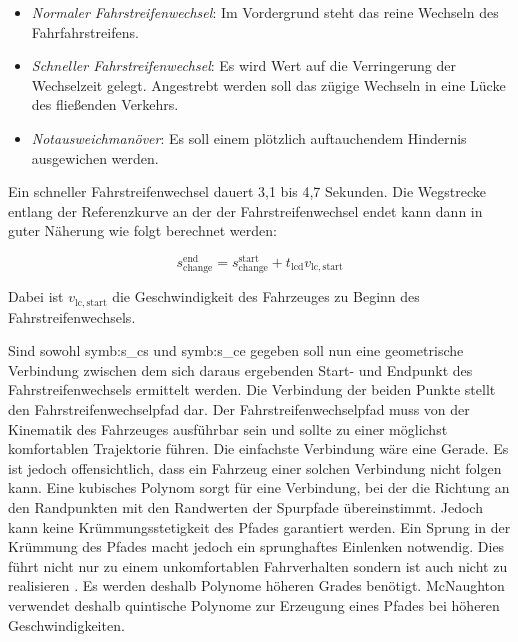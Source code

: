 \begin{itemize}
\item \textit{Normaler Fahrstreifenwechsel}: Im Vordergrund steht das reine Wechseln des Fahrfahrstreifens.
\item \textit{Schneller Fahrstreifenwechsel}: Es wird Wert auf die Verringerung der Wechselzeit gelegt. Angestrebt werden soll das z\"ugige Wechseln in eine L\"ucke des flie{\ss}enden Verkehrs.
\item \textit{Notausweichman\"over}: Es soll einem pl\"otzlich auftauchendem Hindernis ausgewichen werden.
\end{itemize}

Ein schneller Fahrstreifenwechsel dauert 3,1 bis 4,7 Sekunden. 
Die Wegstrecke entlang der Referenzkurve an der der Fahrstreifenwechsel endet kann dann in guter N\"aherung wie folgt berechnet werden:

\begin{equation}
	s_\mathrm{change}^\mathrm{end} = s_\mathrm{change}^\mathrm{start} + t_\mathrm{lcd} v_\mathrm{lc,start}
\end{equation}

Dabei ist \( v_\mathrm{lc,start} \) die Geschwindigkeit des Fahrzeuges zu Beginn des Fahrstreifenwechsels.


Sind sowohl \gls{symb:s_cs} und \gls{symb:s_ce} gegeben soll nun eine geometrische Verbindung zwischen dem sich daraus ergebenden Start- und Endpunkt des Fahrstreifenwechsels ermittelt werden.
Die Verbindung der beiden Punkte stellt den Fahrstreifenwechselpfad dar.
Der Fahrstreifenwechselpfad muss von der Kinematik des Fahrzeuges ausf\"uhrbar sein und sollte zu einer m\"oglichst komfortablen Trajektorie f\"uhren.
Die einfachste Verbindung w\"are eine Gerade.
Es ist jedoch offensichtlich, dass ein Fahrzeug einer solchen Verbindung nicht folgen kann.
Eine kubisches Polynom sorgt f\"ur eine Verbindung, bei der die Richtung an den Randpunkten mit den Randwerten der Spurpfade \"ubereinstimmt.
Jedoch kann keine Kr\"ummungsstetigkeit des Pfades garantiert werden.
Ein Sprung in der Kr\"ummung des Pfades macht jedoch ein sprunghaftes Einlenken notwendig.
Dies f\"uhrt nicht nur zu einem unkomfortablen Fahrverhalten sondern ist auch nicht zu realisieren \cite{Gnatzig2015}.
Es werden deshalb Polynome h\"oheren Grades ben\"otigt.
McNaughton \cite{Mcnau2011} verwendet deshalb quintische Polynome zur Erzeugung eines Pfades bei h\"oheren Geschwindigkeiten.

